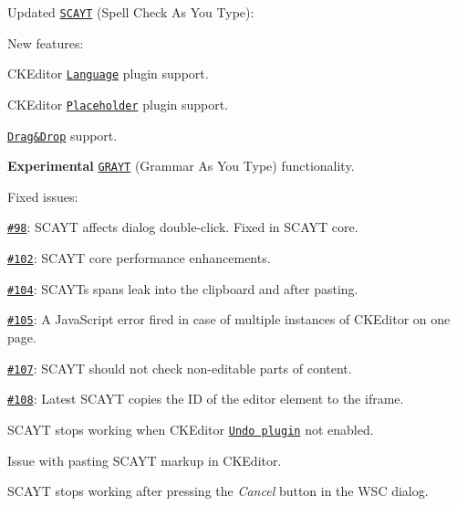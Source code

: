 \begin{DoxyItemize}
\item Updated \href{http://ckeditor.com/addon/scayt}{\tt S\+C\+A\+YT} (Spell Check As You Type)\+:
\begin{DoxyItemize}
\item New features\+:
\begin{DoxyItemize}
\item C\+K\+Editor \href{http://ckeditor.com/addon/language}{\tt Language} plugin support.
\item C\+K\+Editor \href{http://ckeditor.com/addon/placeholder}{\tt Placeholder} plugin support.
\item \href{http://sdk.ckeditor.com/samples/fileupload.html}{\tt Drag\&Drop} support.
\item {\bfseries Experimental} \href{http://docs.ckeditor.com/#!/api/CKEDITOR.config-cfg-grayt_autoStartup}{\tt G\+R\+A\+YT} (Grammar As You Type) functionality.
\end{DoxyItemize}
\item Fixed issues\+:
\begin{DoxyItemize}
\item \href{https://github.com/WebSpellChecker/ckeditor-plugin-scayt/issues/98}{\tt \#98}\+: S\+C\+A\+YT affects dialog double-\/click. Fixed in S\+C\+A\+YT core.
\item \href{https://github.com/WebSpellChecker/ckeditor-plugin-scayt/issues/102}{\tt \#102}\+: S\+C\+A\+YT core performance enhancements.
\item \href{https://github.com/WebSpellChecker/ckeditor-plugin-scayt/issues/104}{\tt \#104}\+: S\+C\+A\+YT\textquotesingle{}s spans leak into the clipboard and after pasting.
\item \href{https://github.com/WebSpellChecker/ckeditor-plugin-scayt/issues/105}{\tt \#105}\+: A Java\+Script error fired in case of multiple instances of C\+K\+Editor on one page.
\item \href{https://github.com/WebSpellChecker/ckeditor-plugin-scayt/issues/107}{\tt \#107}\+: S\+C\+A\+YT should not check non-\/editable parts of content.
\item \href{https://github.com/WebSpellChecker/ckeditor-plugin-scayt/issues/108}{\tt \#108}\+: Latest S\+C\+A\+YT copies the ID of the editor element to the iframe.
\item S\+C\+A\+YT stops working when C\+K\+Editor \href{http://ckeditor.com/addon/undo}{\tt Undo plugin} not enabled.
\item Issue with pasting S\+C\+A\+YT markup in C\+K\+Editor.
\item S\+C\+A\+YT stops working after pressing the {\itshape Cancel} button in the W\+SC dialog.
\end{DoxyItemize}
\end{DoxyItemize}
\end{DoxyItemize}

